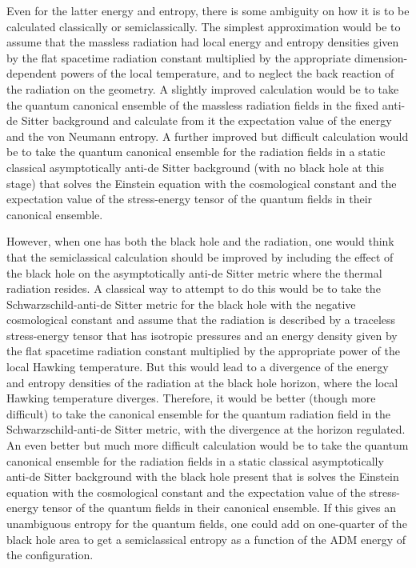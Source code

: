 \documentclass[12pt]{article} \usepackage{latexsym}
\begin{document}
Even for the latter energy and entropy, there is some ambiguity on how
it is to be calculated classically or semiclassically.  The simplest
approximation would be to assume that the massless radiation had local
energy and entropy densities given by the flat spacetime radiation
constant multiplied by the appropriate dimension-dependent powers of
the local temperature, and to neglect the back reaction of the
radiation on the geometry.  A slightly improved calculation would be to
take the quantum canonical ensemble of the massless radiation fields in
the fixed anti-de Sitter background and calculate from it the
expectation value of the energy and the von Neumann entropy.  A further
improved but difficult calculation would be to take the quantum
canonical ensemble for the radiation fields in a static classical
asymptotically anti-de Sitter background (with no black hole at this
stage) that solves the Einstein equation with the cosmological constant
and the expectation value of the stress-energy tensor of the quantum
fields in their canonical ensemble.

However, when one has both the black hole and the radiation, one would
think that the semiclassical calculation should be improved by
including the effect of the black hole on the asymptotically
anti-de Sitter metric where the thermal radiation resides.  A classical
way to attempt to do this would be to take the
Schwarzschild-anti-de Sitter metric for the black hole with the negative
cosmological constant and assume that the radiation is described by a
traceless stress-energy tensor that has isotropic pressures and an
energy density given by the flat spacetime radiation constant
multiplied by the appropriate power of the local Hawking temperature. 
But this would lead to a divergence of the energy and entropy densities
of the radiation at the black hole horizon, where the local Hawking
temperature diverges.  Therefore, it would be better (though more
difficult) to take the canonical ensemble for the quantum radiation
field in the Schwarzschild-anti-de Sitter metric, with the divergence at
the horizon regulated.  An even better but much more difficult
calculation would be to take the quantum canonical ensemble for the
radiation fields in a static classical asymptotically anti-de Sitter
background with the black hole present that is solves the Einstein
equation with the cosmological constant and the expectation value of
the stress-energy tensor of the quantum fields in their canonical
ensemble.  If this gives an unambiguous entropy for the quantum fields,
one could add on one-quarter of the black hole area to get a
semiclassical entropy as a function of the ADM energy of the
configuration.
\end{document}
